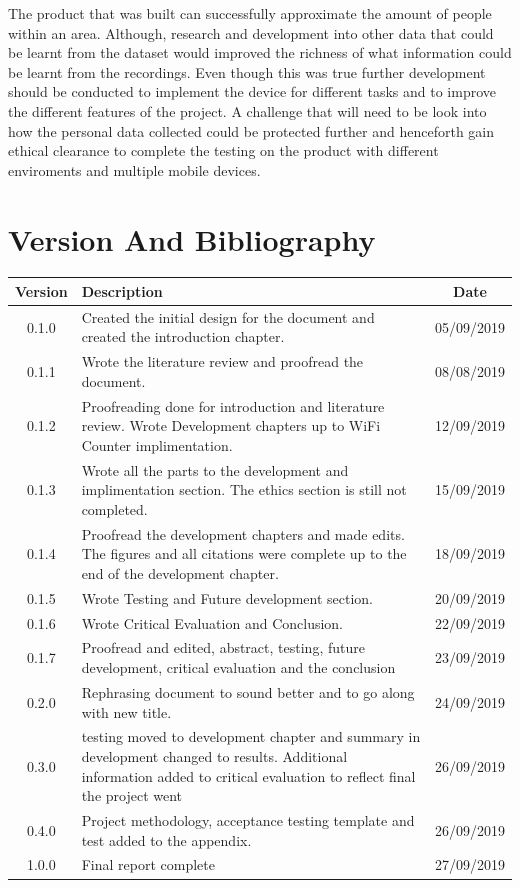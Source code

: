 \documentclass{report}
\begin{document}
The product that was built can successfully approximate the amount of people within an area. Although, research and development into other data that could be learnt from the dataset would improved the richness of what information could be learnt from the recordings. Even though this was true further development should be conducted to implement the device for different tasks and to improve the different features of the project. A challenge that will need to be look into how the personal data collected could be protected further and henceforth gain ethical clearance to complete the testing on the product with different enviroments and multiple mobile devices. 
\clearpage

\chapter{Version And Bibliography}
\begin{table}[h]
    \centering
    \begin{tabular}{c p{12cm} c}
    \hline
        Version & Description & Date  \\
    \hline \hline
        0.1.0 & Created the initial design for the document and created the introduction chapter. & 05/09/2019 \\
        0.1.1 & Wrote the literature review and proofread the document. & 08/08/2019 \\
        0.1.2 & Proofreading done for introduction and literature review. Wrote Development chapters
                    up to WiFi Counter implimentation. & 12/09/2019 \\
        0.1.3 & Wrote all the parts to the development and implimentation section. The ethics section is still not completed. &  15/09/2019\\
        0.1.4 & Proofread the development chapters and made edits. The figures and all citations were complete up to the end of the development chapter. & 18/09/2019\\
        0.1.5 & Wrote Testing and Future development section. & 20/09/2019 \\
        0.1.6 & Wrote Critical Evaluation and Conclusion. & 22/09/2019 \\
        0.1.7 & Proofread and edited, abstract, testing, future development, critical evaluation and the conclusion & 23/09/2019\\
        0.2.0 & Rephrasing document to sound better and to go along with new title. & 24/09/2019 \\
        0.3.0 & testing moved to development chapter and summary in development changed to results. Additional information added to critical evaluation to reflect final the project went & 26/09/2019 \\
        0.4.0 & Project methodology, acceptance testing template and test added to the appendix. & 26/09/2019 \\
        1.0.0 & Final report complete & 27/09/2019 \\
    \hline
    \end{tabular}
    \label{tab:my_label}
\end{table}{}
\end{document}
